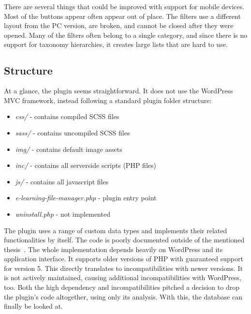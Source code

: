 \documentclass[
  digital,     %
  oneside,     %
  nosansbold,  %
  colorbold, %
  lof,         %
  lot,         %
]{fithesis4}
\begin{document}
There are several things that could be improved with support for mobile devices. Most of the
buttons appear often appear out of place. The filters use a different layout from the PC version,
are broken, and cannot be closed after they were opened. Many of the filters often belong to
a single category, and since there is no support for taxonomy hierarchies, it creates large lists that
are hard to use.

\subsection{Structure}
\label{subsect:plugin-structure}

At a glance, the plugin seems straightforward. It does not use the WordPress MVC framework, instead following a standard  plugin folder structure: \begin{itemize}
	\item \textit{css/} - contains compiled SCSS files
	\item \textit{sass/} - contains uncompiled SCSS files
	\item \textit{img/} - contains default image assets
	\item \textit{inc/} - contains all serverside scripts (PHP files)
	\item \textit{js/} - contains all javascript files
	\item \textit{e-learning-file-manager.php} - plugin entry point
	\item \textit{uninstall.php} - not implemented
\end{itemize}

The plugin uses a range of custom data types and implements their related functionalities by itself.
The code is poorly documented outside of the mentioned thesis~\cite{lang18}. The whole
implementation depends heavily on WordPress and its application interface. It supports older
versions of PHP with guaranteed support for version 5. This directly translates to incompatibilities
with newer versions. It is not actively maintained, causing additional incompatibilities with
WordPress, too. Both the high dependency and incompatibilities pitched a decision to drop the
plugin's code altogether, using only its analysis. With this, the database can finally be looked at.
\end{document}
